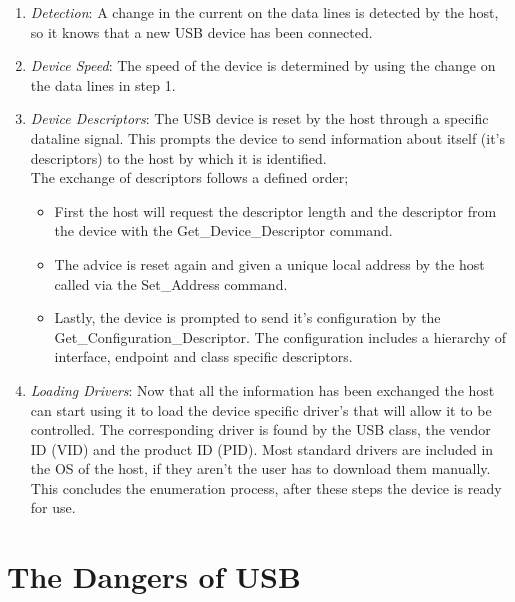 \begin{enumerate}
    \item \emph{Detection}: A change in the current on the data lines is detected by the host, so it knows that a new USB device has been connected.
    \item \emph{Device Speed}: The speed of the device is determined by using the change on  the data lines in step 1.
    \item \emph{Device Descriptors}: The USB device is reset by the host through a specific dataline signal. This prompts the device to send information about itself (it's descriptors) to the host by which it is identified.  \\
    The exchange of descriptors follows a defined order; 
    \begin{itemize}
        \item First the host will request the descriptor length and the descriptor from the device with the Get\_Device\_Descriptor command.
        \item The advice is reset again and given a unique local address by the host called via the Set\_Address command. 
        \item Lastly, the device is prompted to send it's configuration by the Get\_Configuration\_Descriptor. The configuration includes a hierarchy of interface, endpoint and class specific descriptors.  
    \end{itemize}
    \item \emph{Loading Drivers}: Now that all the information has been exchanged the host can start using it to load the device specific driver's that will allow it to be controlled. The corresponding driver is found by the USB class, the vendor ID (VID) and the product ID (PID). Most standard drivers are included in the OS of the host, if they aren't the user has to download them manually. This concludes the enumeration process, after these steps the device is ready for use.
\end{enumerate}




\section{The Dangers of USB} \label{TheDangersOfUSB}

